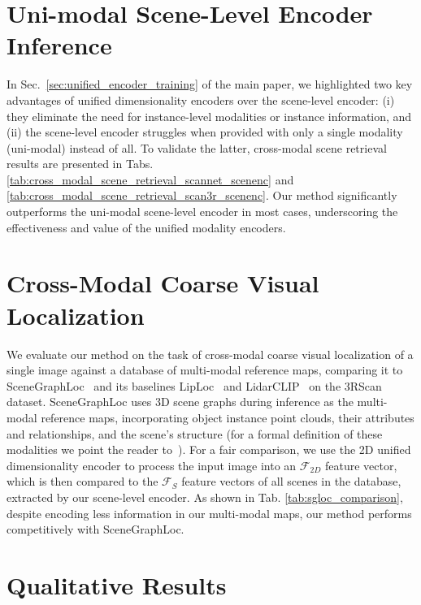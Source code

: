 \section{Uni-modal Scene-Level Encoder Inference}
\label{sec:scene_encoder_avg}

In Sec.~\ref{sec:unified_encoder_training} of the main paper, we highlighted two key advantages of unified dimensionality encoders over the scene-level encoder: (i) they eliminate the need for instance-level modalities or instance information, and (ii) the scene-level encoder struggles when provided with only a single modality (uni-modal) instead of all. To validate the latter, cross-modal scene retrieval results are presented in Tabs. \ref{tab:cross_modal_scene_retrieval_scannet_scenenc} and \ref{tab:cross_modal_scene_retrieval_scan3r_scenenc}. Our method significantly outperforms the uni-modal scene-level encoder in most cases, underscoring the effectiveness and value of the unified modality encoders.


\section{Cross-Modal Coarse Visual Localization}
\label{sec:sgloc_compare}


We evaluate our method on the task of cross-modal coarse visual localization of a single image against a database of multi-modal reference maps, comparing it to SceneGraphLoc~\cite{miao2024scenegraphloc} and its baselines LipLoc~\cite{shubodh2024lip} and LidarCLIP~\cite{lidarclip2024} on the 3RScan dataset. SceneGraphLoc uses 3D scene graphs during inference as the multi-modal reference maps, incorporating object instance point clouds, their attributes and relationships, and the scene's structure (for a formal definition of these modalities we point the reader to~\cite{sarkar2023sgaligner,miao2024scenegraphloc}). For a fair comparison, we use the 2D unified dimensionality encoder to process the input image into an $\mathcal{F}_{2D}$ feature vector, which is then compared to the $\mathcal{F}_{S}$ feature vectors of all scenes in the database, extracted by our scene-level encoder. As shown in Tab. \ref{tab:sgloc_comparison}, despite encoding less information in our multi-modal maps, our method performs competitively with SceneGraphLoc.

\section{Qualitative Results}
\label{sec:qualitative_res}

